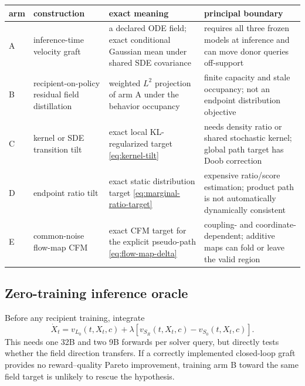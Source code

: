 \documentclass[11pt,a4paper]{article}
\newcommand{\Sbase}{S_0}
\newcommand{\Srl}{S_R}
\newcommand{\Lbase}{L_0}
\theoremstyle{plain}
\theoremstyle{definition}
\begin{document}
\begin{center}
\begin{tabular}{@{}
  >{\raggedright\arraybackslash}p{}
  >{\raggedright\arraybackslash}p{}
  >{\raggedright\arraybackslash}p{}
  >{\raggedright\arraybackslash}p{}
@{}}
\toprule
arm & construction & exact meaning & principal boundary\\
\midrule
A & inference-time velocity graft
& a declared ODE field; exact conditional Gaussian mean under shared SDE covariance
& requires all three frozen models at inference and can move donor queries off-support\\
\addlinespace
B & recipient-on-policy residual field distillation
& weighted $L^2$ projection of arm A under the behavior occupancy
& finite capacity and stale occupancy; not an endpoint distribution objective\\
\addlinespace
C & kernel or SDE transition tilt
& exact local KL-regularized target \eqref{eq:kernel-tilt}
& needs density ratio or shared stochastic kernel; global path target has Doob correction\\
\addlinespace
D & endpoint ratio tilt
& exact static distribution target \eqref{eq:marginal-ratio-target}
& expensive ratio/score estimation; product path is not automatically dynamically consistent\\
\addlinespace
E & common-noise flow-map CFM
& exact CFM target for the explicit pseudo-path \eqref{eq:flow-map-delta}
& coupling- and coordinate-dependent; additive maps can fold or leave the valid region\\
\bottomrule
\end{tabular}
\end{center}

\subsection{Zero-training inference oracle}

Before any recipient training, integrate
\begin{equation}
\dot X_t
=
v_{\Lbase}(t,X_t,c)
+\lambda
\left[
v_{\Srl}(t,X_t,c)
-v_{\Sbase}(t,X_t,c)
\right].
\label{eq:inference-graft}
\end{equation}
This needs one 32B and two 9B forwards per solver query, but directly tests whether the field
direction transfers.  If a correctly implemented closed-loop graft provides no
reward--quality Pareto improvement, training arm B toward the same field target is unlikely to
rescue the hypothesis.
\end{document}
